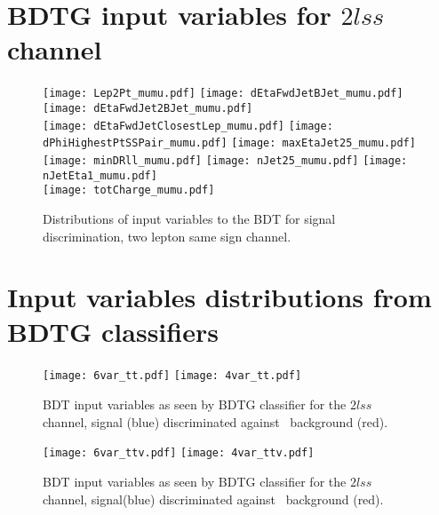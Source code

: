 \section{BDTG input variables for $2lss$ channel }

\begin{figure} [!h]
  \centering
  \texttt{[image: Lep2Pt\_mumu.pdf]}
  \texttt{[image: dEtaFwdJetBJet\_mumu.pdf]}
  \texttt{[image: dEtaFwdJet2BJet\_mumu.pdf]}\\
  \texttt{[image: dEtaFwdJetClosestLep\_mumu.pdf]}
  \texttt{[image: dPhiHighestPtSSPair\_mumu.pdf]}
  \texttt{[image: maxEtaJet25\_mumu.pdf]}\\
  \texttt{[image: minDRll\_mumu.pdf]}
  \texttt{[image: nJet25\_mumu.pdf]}
  \texttt{[image: nJetEta1\_mumu.pdf]}\\
  \texttt{[image: totCharge\_mumu.pdf]}
  \caption[Input variables to the BDT, $2lss$ channel]{Distributions of input variables to the BDT for signal discrimination, two lepton same sign channel.}
  \label{fig:input_vars_2lss}
\end{figure}  

\newpage

\section{Input variables distributions from BDTG classifiers}

\begin{figure} [!h]
  \centering
  \texttt{[image: 6var\_tt.pdf]}
  \texttt{[image: 4var\_tt.pdf]}
  \caption[BDT input variables. Discrimination against \ttbar\ in $2lss$ channel.]{BDT input variables as seen by BDTG classifier for the $2lss$ channel, \tHq signal (blue) discriminated against \ttbar\ background (red).}
  \label{mva_input_2lss_tt}
\end{figure}

\begin{figure} [!h]
  \centering
  \texttt{[image: 6var\_ttv.pdf]}
  \texttt{[image: 4var\_ttv.pdf]}
  \caption[BDT input variables. Discrimination against \ttV\ in $2lss$ channel.]{BDT input variables as seen by BDTG classifier for the $2lss$ channel, \tHq signal(blue) discriminated against \ttV\ background (red).}
  \label{mva_input_2lss_ttv}
\end{figure}

